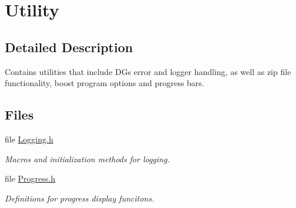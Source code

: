\hypertarget{group___utility_module}{}\section{Utility}
\label{group___utility_module}


\subsection{Detailed Description}
Contains utilities that include DG\textquotesingle{}s error and logger handling, as well as zip file functionality, boost program options and progress bars. 

\subsection*{Files}
\begin{DoxyCompactItemize}
\item 
file \hyperlink{_logging_8h}{Logging.\+h}
\begin{DoxyCompactList}\small\item\em Macros and initialization methods for logging. \end{DoxyCompactList}\item 
file \hyperlink{_progress_8h}{Progress.\+h}
\begin{DoxyCompactList}\small\item\em Definitions for progress display funcitons. \end{DoxyCompactList}\end{DoxyCompactItemize}
